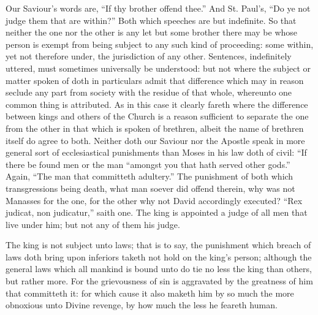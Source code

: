 Our Saviour’s words are, “If thy brother offend thee.” And St. Paul’s, “Do ye not judge them that are within?” Both which speeches are but indefinite. So that neither the one nor the other is any let but some brother there may be  whose person is exempt from being subject to any such kind of proceeding: some within, yet not therefore under, the jurisdiction of any other. Sentences, indefinitely uttered, must sometimes universally be understood: but not where the subject or matter spoken of doth in particulars admit that difference which may in reason seclude any part from society with the residue of that whole, whereunto one common thing is attributed. As in this case it clearly fareth where the difference between kings and others of the Church is a reason sufficient to separate the one from the other in that which is spoken of brethren, albeit the name of brethren itself do agree to both. Neither doth our Saviour nor the Apostle speak in more general sort of ecclesiastical punishments than Moses in his law doth of civil: “If there be found men or the man “amongst you that hath served other gods.” Again, “The man that committeth adultery.” The punishment of both which transgressions being death, what man soever did offend therein, why was not Manasses for the one, for the other why not David accordingly executed? “Rex judicat, non judicatur,” saith one. The king is appointed a judge of all men that live under him; but not any of them his judge.

The king is not subject unto laws; that is to say, the punishment which breach of laws doth bring upon inferiors  taketh not hold on the king’s person; although the general laws which all mankind is bound unto do tie no less the king than others, but rather more. For the grievousness of sin is aggravated by the greatness of him that committeth it: for which cause it also maketh him by so much the more obnoxious unto Divine revenge, by how much the less he feareth human.

